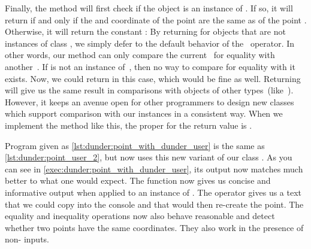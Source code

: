Finally, the  method will first check if the  object is an instance of .
If so, it will return  if and only if the  and  coordinate of the  point are the same as of the point .
Otherwise, it will return the constant :%
%
%
%
By returning  for  objects that are not instances of class , we simply defer to the default behavior of the \pythonilIdx{==}~operator.
In other words, our  method can only compare the current~ for equality with another~.
If  is not an instance of~, then no way to compare for equality with it exists.
Now, we could return  in this case, which would be fine as well.
Returning  will give us the same result in comparisons with objects of other types~(like~).
However, it keeps an avenue open for other programmers to design new classes which support comparison with our  instances in a consistent way.
When we implement the  method like this, the proper  for the return value is .

Program  given as \cref{lst:dunder:point_with_dunder_user} is the same as \cref{lst:dunder:point_user_2}, but now uses this new variant of our class .
As you can see in \cref{exec:dunder:point_with_dunder_user}, its output now matches much better to what one would expect.
The function  now gives us concise and informative output when applied to an instance of .
The  operator gives us a text that we could copy into the console and that would then re-create the point.
The equality and inequality operations now also behave reasonable and detect whether two points have the same coordinates.
They also work in the presence of non- inputs.

